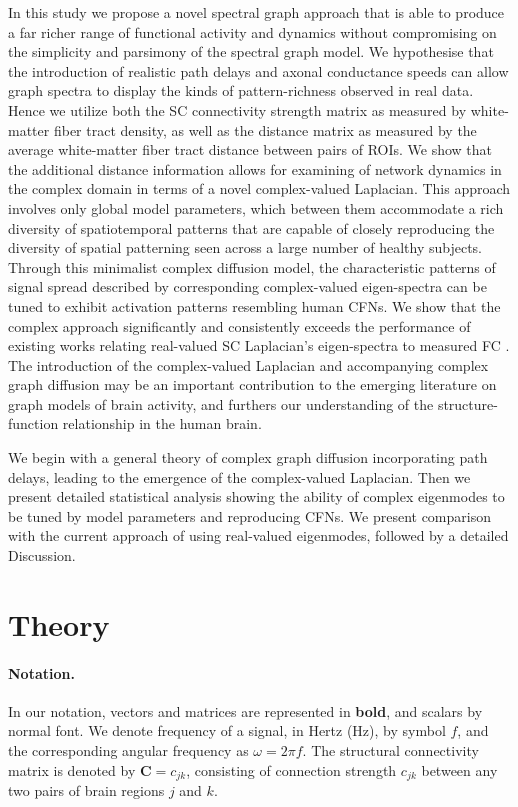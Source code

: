 \documentclass{article}
\begin{document}
In this study we propose a novel spectral graph approach that is able to produce a far richer range of functional activity and dynamics without compromising on the simplicity and parsimony of the spectral graph model. We hypothesise that the introduction of realistic path delays and axonal conductance speeds can allow graph spectra to display the kinds of pattern-richness observed in real data. Hence we utilize both the SC connectivity strength matrix as measured by white-matter fiber tract density, as well as the distance matrix as measured by the average white-matter fiber tract distance between pairs of ROIs. We show that the additional distance information allows for examining of network dynamics in the complex domain in terms of a novel complex-valued Laplacian. This approach involves only global model parameters, which between them accommodate a rich diversity of spatiotemporal patterns that are capable of closely reproducing the diversity of spatial patterning seen across a large number of healthy subjects. Through this minimalist complex diffusion model, the characteristic patterns of signal spread described by corresponding complex-valued eigen-spectra can be tuned to exhibit activation patterns resembling human CFNs. We show that the complex approach significantly and consistently exceeds the performance of existing works relating real-valued SC Laplacian's eigen-spectra to measured FC \cite{Atasoy2016, preti_decoupling_2019, Abdelnour2018, Honey2009}. The introduction of the complex-valued Laplacian and accompanying complex graph diffusion may be an important contribution to the emerging literature on graph models of brain activity, and furthers our understanding of the structure-function relationship in the human brain.

We begin with a general theory of complex graph diffusion incorporating path delays, leading to the emergence of the complex-valued Laplacian. Then we present detailed statistical analysis showing the ability of complex eigenmodes to be tuned by model parameters and reproducing CFNs. We present comparison with the current approach of using real-valued eigenmodes, followed by a detailed Discussion.


\section{Theory}
\label{sec:theory}

\paragraph{Notation.} In our notation, vectors and matrices are represented in \textbf{bold}, and scalars by normal font. We denote frequency of a signal, in Hertz (Hz), by symbol $f$, and the corresponding angular frequency as $\omega = 2 \pi f$. The structural connectivity matrix is denoted by $\bm{C} = c_{jk}$, consisting of connection strength $c_{jk}$ between any two pairs of brain regions $j$ and $k$.
\end{document}
